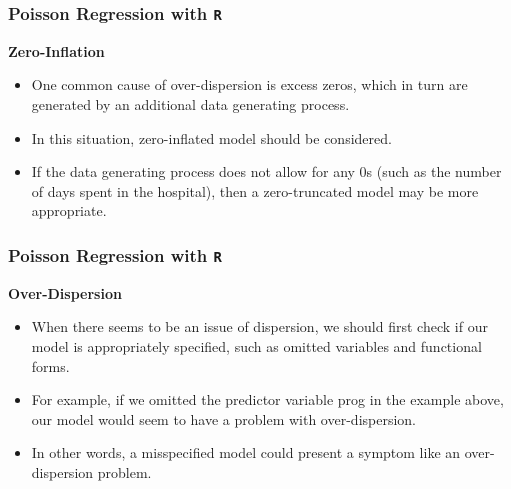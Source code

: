 \documentclass[MASTER.tex]{subfiles}
\begin{document}
\begin{frame}[fragile]
	\frametitle{Poisson Regression with \texttt{R}}
	\Large
	\textbf{Zero-Inflation}
	\begin{itemize}
		\item One common cause of over-dispersion is excess zeros, which in turn are generated by an additional data generating 
		process. 
		\item In this situation, zero-inflated model should be considered.
		\item If the data generating process does not allow for any 0s (such as the number of days spent in the hospital), then a zero-truncated model may be more appropriate.
	\end{itemize}
\end{frame}
\begin{frame}[fragile]
\frametitle{Poisson Regression with \texttt{R}}
	\Large
	\textbf{Over-Dispersion}
	\begin{itemize}
		
		\item When there seems to be an issue of dispersion, we should first check if our model is appropriately specified, 
		such as omitted variables and functional forms. 
		\item For example, if we omitted the predictor variable prog in the example above, our model would seem to have a 
		problem with over-dispersion. 
		\item In other words, a misspecified model could present a symptom like an over-dispersion problem. 
	\end{itemize}
\end{frame}
\end{document}
